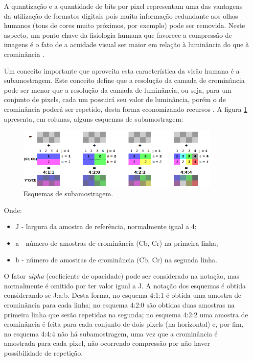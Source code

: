 A quantização e a quantidade de bits por pixel representam uma das vantagens da utilização de formatos digitais pois muita informação redundante aos olhos humanos (tons de cores muito próximos, por exemplo) pode ser removida. Neste aspecto, um ponto chave da fisiologia humana que favorece a compressão de imagens é o fato de a acuidade visual ser maior em relação à luminância do que à crominância \cite{vandenbranden}.

Um conceito importante que aproveita esta característica da visão humana é a subamostragem. Este conceito define que a resolução da camada de crominância pode ser menor que a resolução da camada de luminância, ou seja, para um conjunto de pixels, cada um possuirá seu valor de luminância, porém o de crominância poderá ser repetido, desta forma economizando recursos \cite{brice}. A figura \ref{fig:subsampling} apresenta, em colunas, alguns esquemas de subamostragem:

\begin{figure}[!htb]
	\centering
	\includegraphics[width=0.9\textwidth]{./imgs/subsamplingschemes.png}
	\caption{Esquemas de subamostragem.}
	\label{fig:subsampling}
\end{figure}

Onde:
\begin{itemize}
	\item J - largura da amostra de referência, normalmente igual a 4;
	\item a - número de amostras de crominância (Cb, Cr) na primeira linha;
	\item b - número de amostras de crominância (Cb, Cr) na segunda linha.
\end{itemize}

O fator \emph{alpha} (coeficiente de opacidade) pode ser considerado na notação, mas normalmente é omitido por ter valor igual a J. A notação dos esquemas é obtida considerando-se J:a:b. Desta forma, no esquema 4:1:1 é obtida uma amostra de crominância para cada linha; no esquema 4:2:0 são obtidas duas amostras na primeira linha que serão repetidas na segunda; no esquema 4:2:2 uma amostra de crominância é feita para cada conjunto de dois pixels (na horizontal) e, por fim, no esquema 4:4:4 não há subamostragem, uma vez que a crominância é amostrada para cada pixel, não ocorrendo compressão por não haver possibilidade de repetição.

